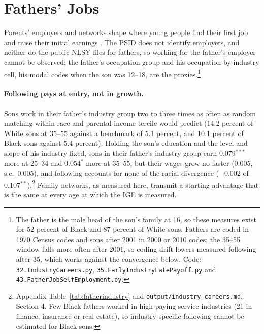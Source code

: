 \section{Fathers' Jobs}\label{sec:fathers}

Parents' employers and networks shape where young people find their first job and raise their initial earnings
\citep{corak2011intergenerational, kramarz2014strong, staiger2022}. The PSID does not identify employers, and neither
do the public NLSY files for fathers, so working for the father's employer cannot be observed; the father's occupation
group and his occupation-by-industry cell, his modal codes when the son was 12--18, are the proxies.\footnote{The
father is the male head of the son's family at 16, so these measures exist for 52 percent of Black and 87 percent of
White sons. Fathers are coded in 1970 Census codes and sons after 2001 in 2000 or 2010 codes; the 35--55 window falls
more often after 2001, so coding drift lowers measured following after 35, which works against the convergence below.
Code: \texttt{32.IndustryCareers.py}, \texttt{35.EarlyIndustryLatePayoff.py} and
\texttt{43.FatherJobSelfEmployment.py}.}

\paragraph{Following pays at entry, not in growth.} Sons work in their father's industry group two to three times as
often as random matching within race and parental-income tercile would predict (14.2 percent of White sons at 35--55
against a benchmark of 5.1 percent, and 10.1 percent of Black sons against 5.4 percent). Holding the son's education
and the level and slope of his industry fixed, sons in their father's industry group earn 0.079$^{***}$ more at 25--34
and 0.054$^{*}$ more at 35--55, but their wages grow no faster (0.005, s.e.\ 0.005), and following accounts for none of
the racial divergence ($-0.002$ of 0.107$^{**}$).\footnote{Appendix Table~\ref{tab:fatherindustry} and
\texttt{output/industry\_careers.md}, Section 4. Few Black fathers worked in high-paying service industries (21 in
finance, insurance or real estate), so industry-specific following cannot be estimated for Black sons.} Family networks,
as measured here, transmit a starting advantage that is the same at every age at which the IGE is measured.

